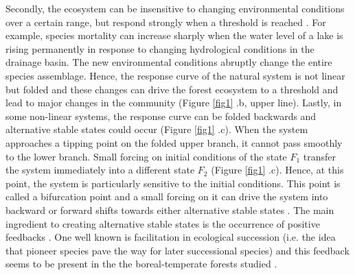 Secondly, the ecosystem can be insensitive to
changing environmental conditions over a certain range, but respond
strongly when a threshold is reached \cite{scheffer2009critical}. For example,
species mortality can increase sharply when the water level of a lake is
rising permanently in response to changing hydrological conditions in the
drainage basin. The new environmental conditions abruptly change the entire species
assemblage. Hence, the response curve of the natural
system is not linear but folded and these changes can drive the forest
ecosystem to a threshold and lead to major changes in the community (Figure
\ref{fig1} .b, upper line).
 Lastly, in some non-linear systems, the response
curve can be folded backwards and alternative stable states could occur
(Figure \ref{fig1} .c). When the system approaches a tipping point on the
folded upper branch, it cannot pass smoothly to the lower branch. Small
forcing on initial conditions of the state $F_1$ transfer the system
immediately into a different state $F_2$ (Figure \ref{fig1} .c). Hence, at
this point, the system is particularly sensitive to the initial conditions.
This point is called a bifurcation point and a small forcing on it can drive
the system into backward or forward shifts towards either alternative stable
states \cite{scheffer2009critical}. The main ingredient to creating
alternative stable states is the occurrence of positive feedbacks \cite{scheffer2009critical}.
One well known is facilitation in ecological succession (i.e. the idea that
pioneer species pave the way for later successional species) and this feedback
seems to be present in the the boreal-temperate forests studied
\cite{Barras1998,Society2014}. \\


